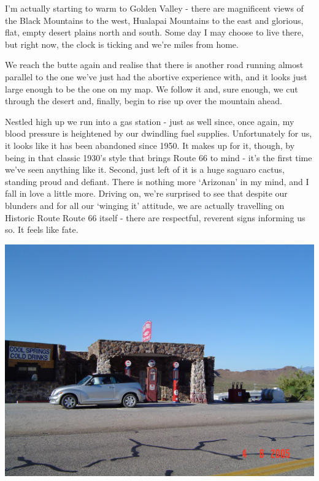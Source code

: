 \documentclass[a5paper,titlepage,11pt]{book}
\begin{document}
I'm actually starting to warm to Golden Valley - there are magnificent views of the Black Mountains to the west, Hualapai Mountains to the east and glorious, flat, empty desert plains north and south. Some day I may choose to live there, but right now, the clock is ticking and we're miles from home.

We reach the butte again and realise that there is another road running almost parallel to the one we've just had the abortive experience with, and it looks just large enough to be the one on my map. We follow it and, sure enough, we cut through the desert and, finally, begin to rise up over the mountain ahead.


Nestled high up we run into a gas station - just as well since, once again, my blood pressure is heightened by our dwindling fuel supplies. Unfortunately for us, it looks like it has been abandoned since 1950. It makes up for it, though, by being in that classic 1930's style that brings Route 66 to mind - it's the first time we've seen anything like it. Second, just left of it is a huge saguaro cactus, standing proud and defiant. There is nothing more `Arizonan' in my mind, and I fall in love a little more. Driving on, we're surprised to see that despite our blunders and for all our `winging it' attitude, we are actually travelling on Historic Route Route 66 itself - there are respectful, reverent signs informing us so. It feels like fate.

\begin{center}\includegraphics[width=\textwidth]{gfx/DSC00700}\end{center}
\end{document}
